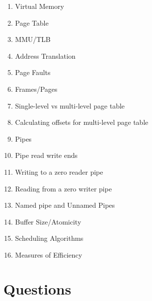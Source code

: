 \begin{enumerate}
	\item Virtual Memory
	\item Page Table
	\item MMU/TLB
	\item Address Translation
	\item Page Faults
	\item Frames/Pages
	\item Single-level vs multi-level page table
	\item Calculating offsets for multi-level page table
	\item Pipes
	\item Pipe read write ends
	\item Writing to a zero reader pipe
	\item Reading from a zero writer pipe
	\item Named pipe and Unnamed Pipes
	\item Buffer Size/Atomicity
	\item Scheduling Algorithms
	\item Measures of Efficiency
\end{enumerate}
	 
\section{Questions}
	 

